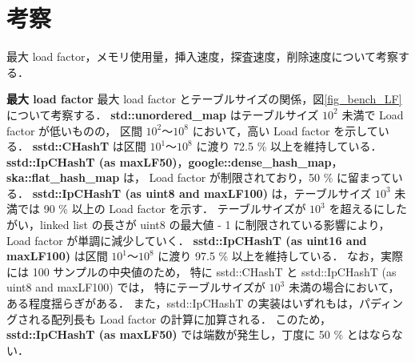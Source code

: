 \chapter{考察}
\label{chap_Discussion}

最大 load factor，メモリ使用量，挿入速度，探査速度，削除速度について考察する．
\leavevmode \newline

%
{\bf 最大 load factor}
\samepage\newline\indent
最大 load factor とテーブルサイズの関係，図\ref{fig_bench_LF}について考察する．
{\bf std::unordered\_map} はテーブルサイズ $10^2$ 未満で Load factor が低いものの，
区間 $10^2〜10^8$ において，高い Load factor を示している．
{\bf sstd::CHashT} は区間 $10^1〜10^8$ に渡り 72.5 \% 以上を維持している．
{\bf sstd::IpCHashT (as maxLF50)}，{\bf google::dense\_hash\_map}，{\bf ska::flat\_hash\_map} は，
Load factor が制限されており，50 \% に留まっている．
{\bf sstd::IpCHashT (as uint8 and maxLF100)} は，テーブルサイズ $10^3$ 未満では 90 \% 以上の Load factor を示す．
テーブルサイズが $10^3$ を超えるにしたがい，linked list の長さが uint8 の最大値 - 1 に制限されている影響により，
Load factor が単調に減少していく．
{\bf sstd::IpCHashT (as uint16 and maxLF100)} は区間 $10^1〜10^8$ に渡り 97.5 \% 以上を維持している．
なお，実際には 100 サンプルの中央値のため，
特に sstd::CHashT と sstd::IpCHashT (as uint8 and maxLF100) では，
特にテーブルサイズが $10^3$ 未満の場合において，ある程度揺らぎがある．
また，sstd::IpCHashT の実装はいずれもは，パディングされる配列長も Load factor の計算に加算される．
このため，{\bf sstd::IpCHashT (as maxLF50)} では端数が発生し，丁度に 50 \% とはならない．
\leavevmode \newline

